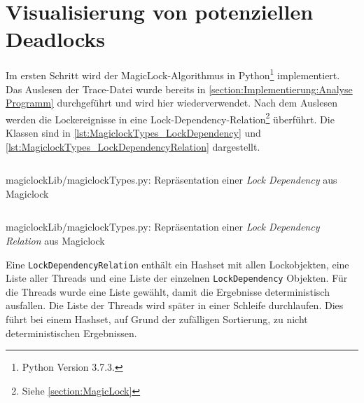 \section{Visualisierung von potenziellen Deadlocks}
\label{section:Implementierung:Visualisierung von potenziellen Deadlocks}
Im ersten Schritt wird der MagicLock-Algorithmus in Python\footnote{Python
Version 3.7.3.} implementiert. Das Auslesen der Trace-Datei wurde bereits in
\cref{section:Implementierung:Analyse Programm} durchgeführt und wird hier
wiederverwendet. Nach dem Auslesen werden die Lockereignisse in eine
Lock-Dependency-Relation\footnote{Siehe \cref{section:MagicLock}} überführt. Die
Klassen sind in \cref{lst:MagiclockTypes_LockDependency} und
\cref{lst:MagiclockTypes_LockDependencyRelation} dargestellt.
\begin{listing}[ht]
  \inputminted[frame=lines,linenos,firstline=45,lastline=49]{python}{./Python/magiclockLib/magiclockTypes.py}
  \caption{magiclockLib/magiclockTypes.py: Repräsentation einer \emph{Lock Dependency} aus Magiclock\autocite[3]{MagicLock}}
  \label{lst:MagiclockTypes_LockDependency}
\end{listing}
\begin{listing}[ht]
  \inputminted[frame=lines,linenos,firstline=67,lastline=77]{python}{./Python/magiclockLib/magiclockTypes.py}
  \caption{magiclockLib/magiclockTypes.py: Repräsentation einer \emph{Lock Dependency Relation} aus Magiclock\autocite[3]{MagicLock}}
  \label{lst:MagiclockTypes_LockDependencyRelation}
\end{listing}
Eine \texttt{LockDependencyRelation} enthält ein Hashset mit allen Lockobjekten,
eine Liste aller Threads und eine Liste der einzelnen \texttt{LockDependency}
Objekten. Für die Threads wurde eine Liste gewählt, damit die Ergebnisse
deterministisch ausfallen. Die Liste der Threads wird später in einer Schleife
durchlaufen. Dies führt bei einem Hashset, auf Grund der zufälligen Sortierung,
zu nicht deterministischen Ergebnissen.

